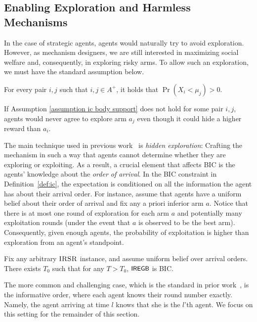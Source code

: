 \subsection{Enabling Exploration and Harmless Mechanisms}\label{subsec:enabling}
In the case of strategic agents, agents would naturally try to avoid exploration. However, as mechanism designers, we are still interested in maximizing social welfare and, consequently, in exploring risky arms. To allow such an exploration, we must have the standard assumption below. 
\begin{assumption}\label{assumption ic body support}
For every pair $i,j$ such that $i,j\in A^+$, it holds that $\Pr(X_i < \mu_j)>0$.
\end{assumption}
If Assumption \ref{assumption ic body support} does not hold for some pair $i,j$, agents would never agree to explore arm $a_j$ even though it could hide a higher reward than $a_i$.


The main technique used in previous work~\cite{mansour2015bayesian,Mansour2016Slivkins} is \emph{hidden exploration}: Crafting the mechanism in such a way that agents cannot determine whether they are exploring or exploiting. As a result, a crucial element that affects BIC is the agents' knowledge about the \emph{order of arrival}. In the BIC constraint in Definition~\ref{def:ic}, the expectation is conditioned on all the information the agent has about their arrival order. For instance, assume that agents have a uniform belief about their order of arrival and fix any a priori inferior arm $a$. Notice that there is at most one round of exploration for each arm $a$ and potentially many exploitation rounds (under the event that $a$ is observed to be the best arm). Consequently, given enough agents, the probability of exploitation is higher than exploration from an agent's standpoint.
\begin{proposition}\label{prop:ic for uniform}
Fix any arbitrary $\textsc{IRSR}$ instance, and assume uniform belief over arrival orders. There exists $T_0$ such that for any $T>T_0$, ${\small\textnormal{\textsf{IREGB}}}$ is BIC.
\end{proposition}
The more common and challenging case, which is the standard in prior work~\cite{Kremer2014,mansour2015bayesian}, is the informative order, where each agent knows their round number exactly. Namely, the agent arriving at time $l$ knows that she is the $l$'th agent. We focus on this setting for the remainder of this section.

